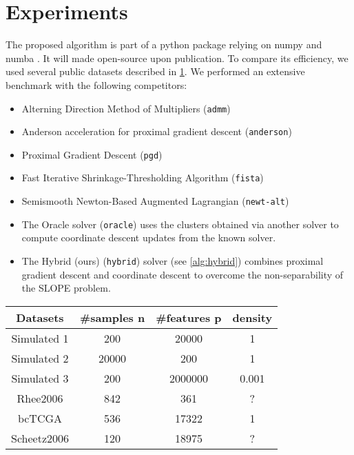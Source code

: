 \section{Experiments}\label{sec:experiments}

The proposed algorithm is part of a python package relying on numpy and numba \cite{harris2020,lam2015}.
It will made open-source upon publication. To compare its efficiency, we used several public datasets described in \cref{table:datasets}.
We performed an extensive benchmark with the following competitors:
\begin{itemize}[noitemsep]
  \item Alterning Direction Method of Multipliers (\texttt{admm}) \cite{boyd2010}
  \item Anderson acceleration for proximal gradient descent (\texttt{anderson}) \cite{zhang2020}
  \item Proximal Gradient Descent (\texttt{pgd}) \cite{combettes2005}
  \item Fast Iterative Shrinkage-Thresholding Algorithm (\texttt{fista}) \cite{beck2009}
  \item Semismooth Newton-Based Augmented Lagrangian (\texttt{newt-alt}) \cite{Ziyan2019}
  \item The Oracle solver (\texttt{oracle}) uses the clusters obtained via another
   solver to compute coordinate descent updates from the known solver.
  \item The Hybrid (ours) (\texttt{hybrid}) solver (see \cref{alg:hybrid}) combines proximal gradient descent
   and coordinate descent to overcome the non-separability of the SLOPE problem.
\end{itemize}

\begin{table}[]
  \centering
  \label{table:datasets}
  \begin{tabular}{cccc}
  \hline
  Datasets    & \#samples n & \#features p & density \\ \hline
  Simulated 1 & 200 & \num{20000} & 1 \\
  Simulated 2 & \num{20000} & \num{200} & 1 \\
  Simulated 3 & 200 & \num{2000000} & 0.001 \\ 
  Rhee2006    & 842         & 361          & ?       \\ 
  bcTCGA      & 536         & \num{17322}        & 1       \\
  Scheetz2006 & 120         & \num{18975}        & ?       \\ \hline
  \end{tabular}
\end{table}

